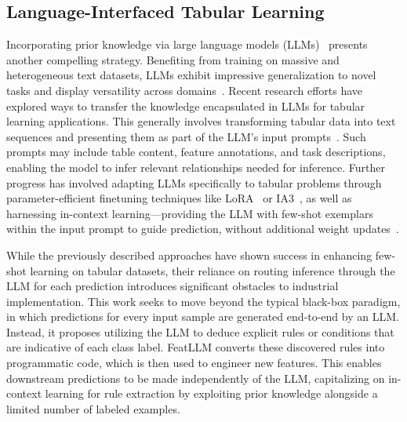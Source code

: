 \subsection{Language-Interfaced Tabular Learning}  
Incorporating prior knowledge via large language models (LLMs)~\cite{anil2023palm,openai2023gpt4} presents another compelling strategy. Benefiting from training on massive and heterogeneous text datasets, LLMs exhibit impressive generalization to novel tasks and display versatility across domains~\cite{brown2020language}. Recent research efforts have explored ways to transfer the knowledge encapsulated in LLMs for tabular learning applications. This generally involves transforming tabular data into text sequences and presenting them as part of the LLM’s input prompts~\cite{dinh2022lift,hegselmann2023tabllm,wang2023anypredict}. Such prompts may include table content, feature annotations, and task descriptions, enabling the model to infer relevant relationships needed for inference. Further progress has involved adapting LLMs specifically to tabular problems through parameter-efficient finetuning techniques like LoRA~\cite{hu2021lora} or IA3~\cite{liu2022few}, as well as harnessing in-context learning—providing the LLM with few-shot exemplars within the input prompt to guide prediction, without additional weight updates~\cite{dinh2022lift,hegselmann2023tabllm,nam2023semi,slack2023tablet}.

While the previously described approaches have shown success in enhancing few-shot learning on tabular datasets, their reliance on routing inference through the LLM for each prediction introduces significant obstacles to industrial implementation. This work seeks to move beyond the typical black-box paradigm, in which predictions for every input sample are generated end-to-end by an LLM. Instead, it proposes utilizing the LLM to deduce explicit rules or conditions that are indicative of each class label. \textsf{FeatLLM} converts these discovered rules into programmatic code, which is then used to engineer new features. This enables downstream predictions to be made independently of the LLM, capitalizing on in-context learning for rule extraction by exploiting prior knowledge alongside a limited number of labeled examples.

